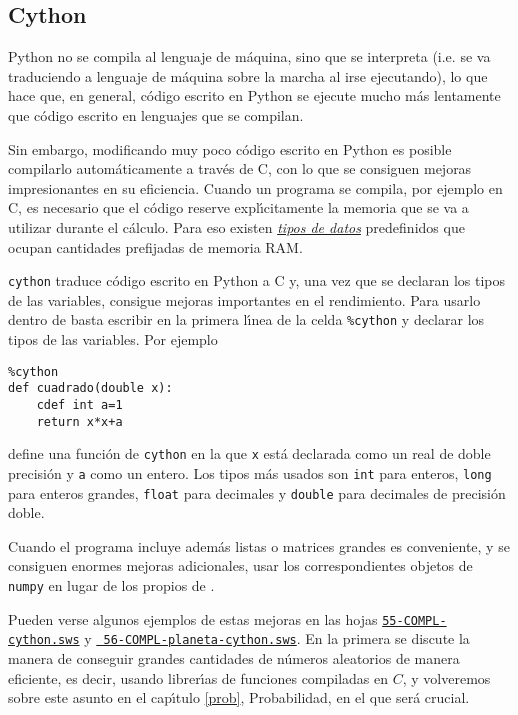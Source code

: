 \subsection{Cython}\label{cython}

Python no se compila al lenguaje de m\'aquina, sino que se interpreta (i.e. se
va traduciendo a lenguaje de m\'aquina sobre la marcha al irse ejecutando),  lo
que hace que, en general, c\'odigo escrito en Python se ejecute mucho m\'as
lentamente que c\'odigo escrito en  lenguajes que se compilan. 

Sin embargo, modificando muy poco c\'odigo escrito en Python es posible
compilarlo autom\'aticamente a trav\'es de  C, con lo que se consiguen mejoras
impresionantes en su eficiencia. Cuando un programa se compila, por ejemplo en
C, es 
necesario que el c\'odigo reserve expl\'{\i}citamente   la memoria que se va
a utilizar durante el c\'alculo. 
Para eso existen \hyperref[tipos]{\itshape tipos de datos} predefinidos que
ocupan cantidades prefijadas de memoria RAM. 


\lstinline|cython| traduce c\'odigo escrito en Python a C y, una vez que se
declaran los
tipos de las variables, consigue mejoras importantes en el rendimiento. Para
usarlo dentro de {\sage} basta escribir en la primera l\'{\i}nea de  la celda 
\lstinline|%cython| y declarar los tipos de las variables. Por ejemplo

\begin{lstlisting}
%cython
def cuadrado(double x):
    cdef int a=1
    return x*x+a
\end{lstlisting}
\noindent define una  funci\'on de \lstinline|cython| en la que \lstinline$x$
est\'a declarada como un
real de doble precisi\'on y \lstinline$a$ como un entero. Los tipos m\'as usados
son
\lstinline|int| para enteros, \lstinline|long| para enteros grandes,
\lstinline|float| para decimales y \lstinline|double| para decimales de
precisi\'on doble. 



Cuando el programa incluye adem\'as listas o matrices grandes es conveniente, y
se consiguen enormes mejoras adicionales,  usar los correspondientes objetos de
\lstinline|numpy| en lugar de los propios de {\sage}. 


Pueden verse algunos ejemplos de estas mejoras en las hojas 
\href{http://sage.mat.uam.es:8888/home/pub/12/}{\tt 55-COMPL-cython.sws} y 
\href{http://sage.mat.uam.es:8888/home/pub/13/}{\tt
56-COMPL-planeta-cython.sws}. En la primera se discute la manera de conseguir
grandes cantidades de n\'umeros aleatorios de manera eficiente, es decir, usando
librer\'{\i}as de funciones compiladas en $C$, y volveremos sobre este asunto en
el cap\'{\i}tulo \ref{prob}, Probabilidad,  en el que ser\'a crucial.

